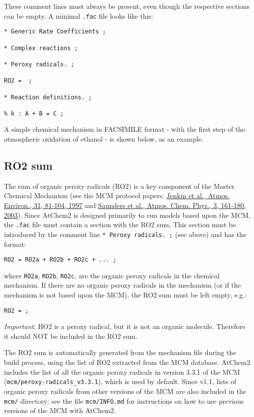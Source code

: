 These comment lines must always be present, even though the respective
sections can be empty. A minimal \texttt{.fac} file looks like this:

\begin{verbatim}
* Generic Rate Coefficients ;

* Complex reactions ;

* Peroxy radicals. ;

RO2 =  ;

* Reaction definitions. ;

% k : A + B = C ;
\end{verbatim}

A simple chemical mechanism in FACSIMILE format - with the first step of
the atmospheric oxidation of ethanol - is shown below, as an example.

\subsection{RO2 sum}\label{ro2-sum}

The sum of organic peroxy radicals (RO2) is a key component of the
Master Chemical Mechanism (see the MCM protocol papers:
\href{https://doi.org/10.1016/S1352-2310(96)00105-7}{Jenkin et al.,
Atmos. Environ., 31, 81-104, 1997} and
\href{https://doi.org/10.5194/acp-3-161-2003}{Saunders et al., Atmos.
Chem. Phys., 3, 161-180, 2003}). Since AtChem2 is designed primarily to
run models based upon the MCM, the \texttt{.fac} file must contain a
section with the RO2 sum. This section must be introduced by the comment
line \texttt{*\ Peroxy\ radicals.\ ;} (see above) and has the format:

\begin{verbatim}
RO2 = RO2a + RO2b + RO2c + ... ;
\end{verbatim}

where \texttt{RO2a}, \texttt{RO2b}, \texttt{RO2c}, are the organic
peroxy radicals in the chemical mechanism. If there are no organic
peroxy radicals in the mechanism (or if the mechanism is not based upon
the MCM), the RO2 sum must be left empty, e.g.:

\begin{verbatim}
RO2 = ;
\end{verbatim}

\emph{Important}: HO2 is a peroxy radical, but it is not an organic
molecule. Therefore it should NOT be included in the RO2 sum.

The RO2 sum is automatically generated from the mechanism file during
the build process, using the list of RO2 extracted from the MCM
database. AtChem2 includes the list of all the organic peroxy radicals
in version 3.3.1 of the MCM (\texttt{mcm/peroxy-radicals\_v3.3.1}),
which is used by default. Since v1.1, lists of organic peroxy radicals
from other versions of the MCM are also included in the \texttt{mcm/}
directory: see the file \texttt{mcm/INFO.md} for instructions on how to
use previous versions of the MCM with AtChem2.

